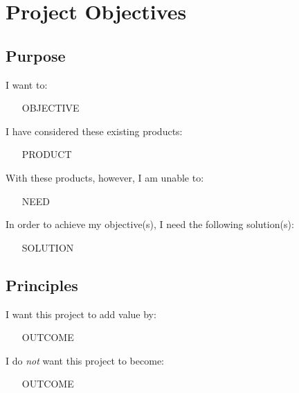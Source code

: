 \section{Project Objectives}\label{sec:dod/objectives}

\subsection*{Purpose}\label{sub:dod/objectives/purpose}
I want to:
\begin{itemize}
    \item [OBJECTIVE]
\end{itemize}

I have considered these existing products:
\begin{itemize}
    \item [PRODUCT]
\end{itemize}

With these products, however, I am unable to:
\begin{itemize}
    \item [NEED]
\end{itemize}

In order to achieve my objective(s), I need the following solution(s):
\begin{itemize}
    \item [SOLUTION]
\end{itemize}

\subsection*{Principles}\label{sub:dod/objectives/principles}
I want this project to add value by:
\begin{itemize}
    \item [OUTCOME]
\end{itemize}

I do \emph{not} want this project to become:
\begin{itemize}
    \item [OUTCOME]
\end{itemize}

